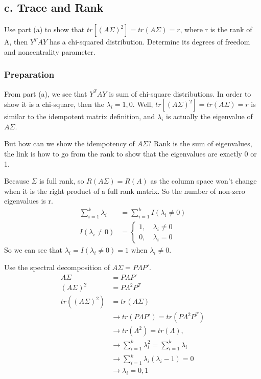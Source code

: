 \subsection{c. Trace and Rank}

 Use part (a) to show that $tr[(A\Sigma)^2] = tr(A \Sigma) = r$, where r is the rank of
A, then $Y^TAY$ has a chi-squared distribution. Determine its degrees of freedom and noncentrality parameter.

\subsubsection{Preparation}
From part (a), we see that $Y^TAY$ is sum of chi-square distributions. In order to show it is a chi-square, then the $\lambda_i = 1, 0$. Well,  $tr[(A\Sigma)^2] = tr(A \Sigma) = r$ is similar to the idempotent matrix definition, and $\lambda_i $ is actually the eigenvalue of $A\Sigma$. 

But how can we show the idempotency of $A\Sigma$? Rank is the sum of eigenvalues, the link is how to go from the rank to show that the eigenvalues are exactly 0 or 1. 

Because $\Sigma$ is full rank, so $R(A\Sigma) = R(A)$ as the column space won't change when it is the right product of a full rank matrix. So the number of non-zero eigenvalues is r.
\begin{align*}
	\sum_{i=1}^k \lambda_i & = \sum_{i=1}^k I(\lambda_i \neq 0) \\
	I(\lambda_i \neq 0) & = \begin{cases*}
	1, \quad \lambda_i \neq 0\\
	0, \quad \lambda_i =0
\end{cases*}
\end{align*}
So we can see that $\lambda_i = I(\lambda_i \neq 0) = 1$ when $\lambda_i \neq 0$.

Use the spectral decomposition of $A\Sigma = P \Lambda P'$. 
\begin{align*}
	A\Sigma & = P \Lambda P'\\
	(A\Sigma)^2 &= P \Lambda^2 P^T\\
	tr((A\Sigma)^2) &= tr(A\Sigma) \\
	& \rightarrow tr(P \Lambda P') = tr(P \Lambda^2 P^T)\\
	& \rightarrow tr(\Lambda^2) = tr(\Lambda), \\
	& \rightarrow \sum_{i=1}^k \lambda_i^2 = \sum_{i=1}^k \lambda_i \\
	& \rightarrow \sum_{i=1}^k \lambda_i (\lambda_i -1) = 0 \\
	& \rightarrow \lambda_i = 0, 1
\end{align*}



